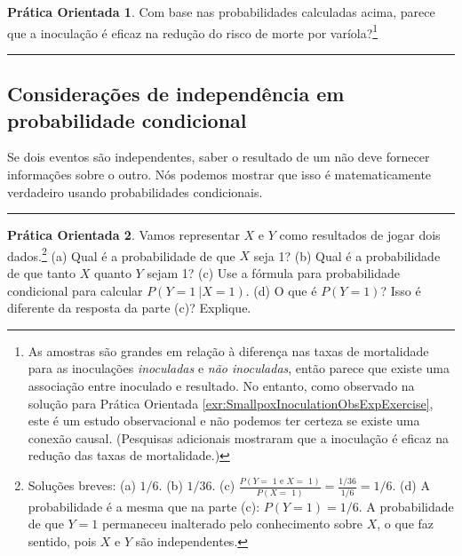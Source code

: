 \documentclass[
]{book}
\theoremstyle{definition}
\theoremstyle{definition}
\theoremstyle{definition}
\newtheorem{exercise}{Prática Orientada}[chapter]
\theoremstyle{definition}
\theoremstyle{remark}
\begin{document}
\begin{exercise}
\protect\hypertarget{exr:unnamed-chunk-64}{}{\label{exr:unnamed-chunk-64} }Com base nas probabilidades calculadas acima, parece que a inoculação é eficaz na redução do risco de morte por varíola?\footnote{As amostras são grandes em relação à diferença nas taxas de mortalidade para as inoculações \emph{inoculadas} e \emph{não inoculadas}, então parece que existe uma associação entre inoculado e resultado. No entanto, como observado na solução para Prática Orientada \ref{exr:SmallpoxInoculationObsExpExercise}, este é um estudo observacional e não podemos ter certeza se existe uma conexão causal. (Pesquisas adicionais mostraram que a inoculação é eficaz na redução das taxas de mortalidade.)}
\end{exercise}

\begin{center}\rule{0.5\linewidth}{0.5pt}\end{center}

\hypertarget{indConsiderationsCondProb}{%
\subsection{Considerações de independência em probabilidade condicional}\label{indConsiderationsCondProb}}

Se dois eventos são independentes, saber o resultado de um não deve fornecer informações sobre o outro. Nós podemos mostrar que isso é matematicamente verdadeiro usando probabilidades condicionais.

\begin{center}\rule{0.5\linewidth}{0.5pt}\end{center}

\begin{exercise}
\protect\hypertarget{exr:condProbOfRollingA1AfterOne1}{}{\label{exr:condProbOfRollingA1AfterOne1} }Vamos representar \(X\) e \(Y\) como resultados de jogar dois dados.\footnote{Soluções breves: (a) \(1/6\). (b) \(1/36\). (c) \(\frac{P(Y = \text{ 1 e }X=\text{ 1})}{P(X=\text{ 1})} = \frac{1/36}{1/6} = 1/6\). (d) A probabilidade é a mesma que na parte (c): \(P(Y=1)=1/6\). A probabilidade de que \(Y=1\) permaneceu inalterado pelo conhecimento sobre \(X\), o que faz sentido, pois \(X\) e \(Y\) são independentes.}
(a) Qual é a probabilidade de que \(X\) seja 1?
(b) Qual é a probabilidade de que tanto \(X\) quanto \(Y\) sejam 1?
(c) Use a fórmula para probabilidade condicional para calcular \(P(Y = 1\ | X = 1)\).
(d) O que é \(P(Y=1)\)? Isso é diferente da resposta da parte (c)? Explique.
\end{exercise}
\end{document}
